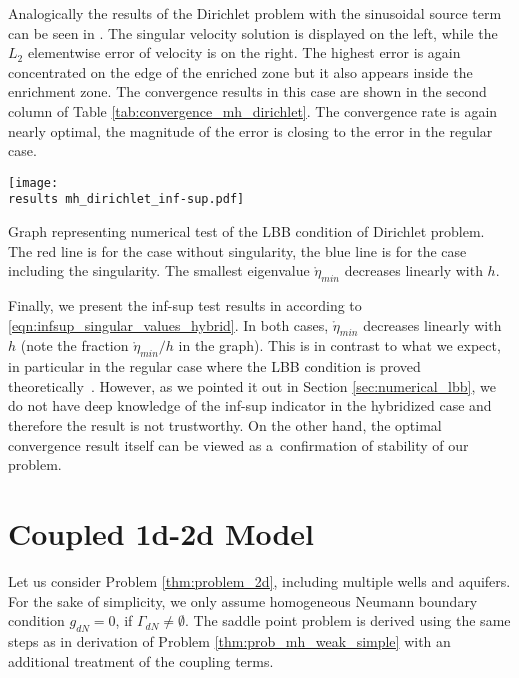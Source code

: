 Analogically the results of the Dirichlet problem with the sinusoidal source term can be seen in .
The singular velocity solution is displayed on the left, while the $L_2$ elementwise error of velocity is on the right.
The highest error is again concentrated on the edge of the enriched zone but it also appears
inside the enrichment zone. 
The convergence results in this case are shown in the second column of Table \ref{tab:convergence_mh_dirichlet}.
The convergence rate is again nearly optimal, the magnitude of the error is closing to the error in the regular case.
%
\begin{graph}[!htb]
    \centering    
    \texttt{[image: \\results mh\_dirichlet\_inf-sup.pdf]} 
    \caption[Numerical test of inf-sup stability.]
  {Graph representing numerical test of the LBB condition of Dirichlet problem.
  The red line is for the case without singularity, the blue line is for the case including the singularity.
  The smallest eigenvalue $\mathring\eta_{min}$ decreases linearly with $h$.}
  \label{graph:mh_dirichlet_inf-sup}
\end{graph}

Finally, we present the inf-sup test results in  according to \eqref{eqn:infsup_singular_values_hybrid}.
In both cases, $\mathring\eta_{min}$ decreases linearly with $h$ (note the fraction $\mathring\eta_{min}/h$ in the graph).
This is in contrast to what we expect, in particular in the regular case where the LBB condition is proved theoretically~\cite{sistek_bddc_2015}.
However, as we pointed it out in Section \ref{sec:numerical_lbb}, we do not have deep knowledge of the inf-sup indicator in the hybridized case
and therefore the result is not trustworthy. On the other hand, the optimal convergence result itself can be viewed as a~confirmation
of stability of our problem.

\section{Coupled 1d-2d Model}
\label{sec:coupled_12d}
Let us consider Problem \ref{thm:problem_2d}, including multiple wells and aquifers.
For the sake of simplicity, we only assume homogeneous Neumann boundary condition $g_{dN}=0$, if $\Gamma_{dN}\neq\emptyset$.
The saddle point problem is derived using the same steps
as in derivation of Problem \ref{thm:prob_mh_weak_simple} with an additional treatment of the coupling terms.

